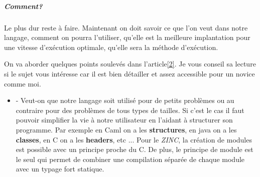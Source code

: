 \documentclass[10pt,a4paper]{report}
\begin{document}
\subparagraph{Comment?}	
Le plus dur reste à faire. Maintenant on doit savoir ce que l'on veut dans notre langage, comment on pourra l'utiliser, qu'elle
est la meilleure implantation pour une vitesse d'exécution optimale, qu'elle sera la méthode d'exécution. 
\medbreak

On va aborder quelques points soulevés dans l'article\hyperref[ZINC]{[2]}. Je vous conseil sa lecture si le sujet vous intéresse
car il est bien détailler et assez accessible pour un novice comme moi.
\begin{itemize}
\item[] - Veut-on que notre langage soit utilisé pour de petits problèmes ou au contraire pour des problèmes de tous types de tailles.
  Si c'est le cas il faut pouvoir simplifier la vie à notre utilisateur en l'aidant à structurer son programme. Par exemple en Caml
  on a les \textbf{structures}, en java on a les \textbf{classes}, en C on a les \textbf{headers}, etc ... Pour le \textit{ZINC},
  la création de modules est possible avec un principe proche du C. De plus, le principe de module est le seul qui permet de combiner
  une compilation séparée de chaque module avec un typage fort statique.
  \medbreak
  

\end{itemize}
\end{document}
